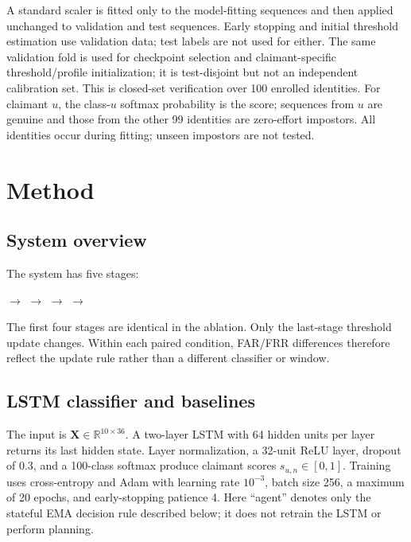 \documentclass[3p,times,procedia]{elsarticle}
\begin{document}
A standard scaler is fitted only to the model-fitting sequences and then
applied unchanged to validation and test sequences. Early stopping and initial
threshold estimation use validation data; test labels are not used for either.
The same validation fold is used for checkpoint selection and claimant-specific
threshold/profile initialization; it is test-disjoint but not an independent
calibration set. This is closed-set verification over 100 enrolled identities.
For claimant $u$, the class-$u$ softmax probability is the score; sequences from
$u$ are genuine and those from the other 99 identities are zero-effort
impostors. All identities occur during fitting; unseen impostors are not tested.

\section{Method}
\label{sec:method}

\subsection{System overview}

The system has five stages:

\begin{center}
 $\rightarrow$
 $\rightarrow$
 $\rightarrow$
 $\rightarrow$
\end{center}

The first four stages are identical in the ablation. Only the last-stage
threshold update changes. Within each paired condition, FAR/FRR differences
therefore reflect the update rule rather than a different classifier or window.

\subsection{LSTM classifier and baselines}

The input is $\mathbf{X}\in\mathbb{R}^{10\times36}$. A two-layer LSTM with 64
hidden units per layer returns its last hidden state. Layer normalization,
a 32-unit ReLU layer, dropout of 0.3, and a 100-class softmax produce claimant
scores $s_{u,n}\in[0,1]$. Training uses cross-entropy and Adam
with learning rate $10^{-3}$, batch size 256, a maximum of 20 epochs, and
early-stopping patience 4.
Here ``agent'' denotes only the stateful EMA decision rule described below; it
does not retrain the LSTM or perform planning.
\end{document}
